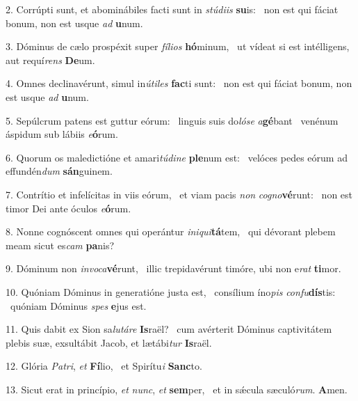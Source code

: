 2. Corrúpti sunt, et abominábiles facti sunt in \textit{stú}\textit{di}\textit{is} \textbf{su}is: \ast\  non est qui fáciat bonum, non est usque \textit{ad} \textbf{u}num.\

3. Dóminus de cælo prospéxit super \textit{fí}\textit{li}\textit{os} \textbf{hó}minum, \ast\  ut vídeat si est intélligens, aut requí\textit{rens} \textbf{De}um.\

4. Omnes declinavérunt, simul in\textit{ú}\textit{ti}\textit{les} \textbf{fac}ti sunt: \ast\  non est qui fáciat bonum, non est usque \textit{ad} \textbf{u}num.\

5. Sepúlcrum patens est guttur eórum: \dag\  linguis suis do\textit{ló}\textit{se} \textit{a}\textbf{gé}bant \ast\  venénum áspidum sub lábiis \textit{e}\textbf{ó}rum.\

6. Quorum os maledictióne et amari\textit{tú}\textit{di}\textit{ne} \textbf{ple}num est: \ast\  velóces pedes eórum ad effundén\textit{dum} \textbf{sán}guinem.\

7. Contrítio et infelícitas in viis eórum, \dag\  et viam pacis \textit{non} \textit{co}\textit{gno}\textbf{vé}runt: \ast\  non est timor Dei ante óculos \textit{e}\textbf{ó}rum.\

8. Nonne cognóscent omnes qui operántur \textit{in}\textit{i}\textit{qui}\textbf{tá}tem, \ast\  qui dévorant plebem meam sicut es\textit{cam} \textbf{pa}nis?\

9. Dóminum non \textit{in}\textit{vo}\textit{ca}\textbf{vé}runt, \ast\  illic trepidavérunt timóre, ubi non e\textit{rat} \textbf{ti}mor.\

10. Quóniam Dóminus in generatióne justa est, \dag\  consílium íno\textit{pis} \textit{con}\textit{fu}\textbf{dís}tis: \ast\  quóniam Dóminus \textit{spes} \textbf{e}jus est.\

11. Quis dabit ex Sion sa\textit{lu}\textit{tá}\textit{re} \textbf{Is}raël? \ast\  cum avérterit Dóminus captivitátem plebis suæ, exsultábit Jacob, et lætábi\textit{tur} \textbf{Is}raël.\

12. Glória \textit{Pa}\textit{tri}, \textit{et} \textbf{Fí}lio, \ast\  et Spirítu\textit{i} \textbf{Sanc}to.\

13. Sicut erat in princípio, \textit{et} \textit{nunc}, \textit{et} \textbf{sem}per, \ast\  et in sǽcula sæculó\textit{rum}. \textbf{A}men.\

